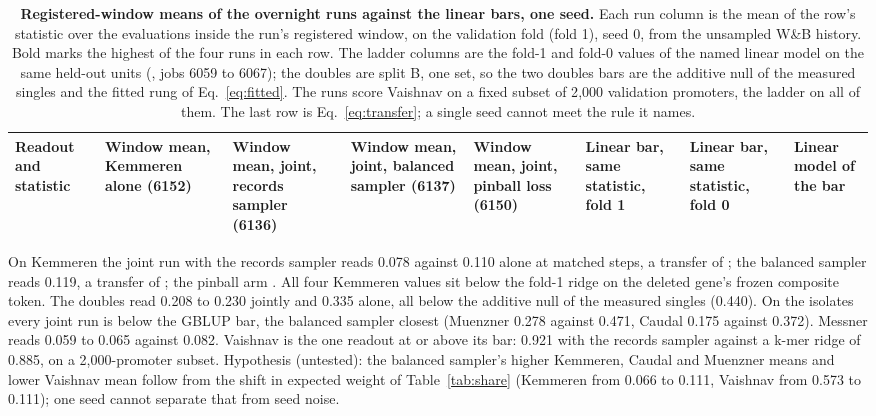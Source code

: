 \begin{table}[htbp]
\centering
\footnotesize
\setlength{\tabcolsep}{3pt}
\caption[]{\textbf{Registered-window means of the overnight runs against the
linear bars, one seed.} Each run column is the mean of the row's statistic over the
evaluations inside the run's registered window, on the validation fold (fold 1), seed 0,
from the unsampled W\&B history. Bold marks the highest of the four runs in each row. The
ladder columns are the fold-1 and fold-0 values of the named linear model on the same held-out
units (, jobs 6059 to 6067); the doubles are split B, one set, so
the two doubles bars are the additive null of the measured singles and the fitted rung of
Eq.~\ref{eq:fitted}. The runs score Vaishnav on a fixed subset of 2{,}000 validation
promoters, the ladder on all of them. The last row is Eq.~\ref{eq:transfer}; a single seed
cannot meet the rule it names.}
\label{tab:measured}
\begin{tabular}{>{\raggedright\arraybackslash}p{40mm}>{\raggedleft\arraybackslash}p{15mm}>{\raggedleft\arraybackslash}p{15mm}>{\raggedleft\arraybackslash}p{15mm}>{\raggedleft\arraybackslash}p{15mm}>{\raggedleft\arraybackslash}p{17mm}>{\raggedleft\arraybackslash}p{15mm}>{\raggedright\arraybackslash}p{28mm}}
\toprule
Readout and statistic & Window mean, Kemmeren alone (6152) & Window mean, joint, records sampler (6136) & Window mean, joint, balanced sampler (6137) & Window mean, joint, pinball loss (6150) & Linear bar, same statistic, fold 1 & Linear bar, same statistic, fold 0 & Linear model of the bar \\
\midrule

\end{tabular}
\end{table}

On Kemmeren the joint run with the records sampler reads 0.078 against 0.110 alone at
matched steps, a transfer of \tdTransferRecords; the balanced sampler reads 0.119, a
transfer of \tdTransferBalanced; the pinball arm \tdTransferPinball. All four Kemmeren values
sit below the fold-1 ridge on the deleted gene's frozen composite token. The doubles read
0.208 to 0.230 jointly and 0.335 alone, all below the additive null of the measured singles
(0.440). On the isolates every joint run is below the GBLUP bar, the balanced sampler
closest (Muenzner 0.278 against 0.471, Caudal 0.175 against 0.372). Messner reads 0.059 to
0.065 against 0.082. Vaishnav is the one readout at or above its bar: 0.921 with the
records sampler against a k-mer ridge of 0.885, on a 2{,}000-promoter subset. Hypothesis
(untested): the balanced sampler's higher Kemmeren, Caudal and Muenzner means and lower
Vaishnav mean follow from the shift in expected weight of Table~\ref{tab:share} (Kemmeren
from 0.066 to 0.111, Vaishnav from 0.573 to 0.111); one seed cannot separate that from
seed noise.

